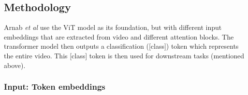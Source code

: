 \subsection{Methodology}

\par Arnab \textit{et al} use the ViT model \cite{vit} as its foundation, but with different input embeddings that are extracted from video and different attention blocks. 
The transformer model then outputs a classification ([class]) token which represents the entire video. 
This [class] token is then used for downstream tasks (mentioned above).\par

\subsubsection{Input: Token embeddings}

